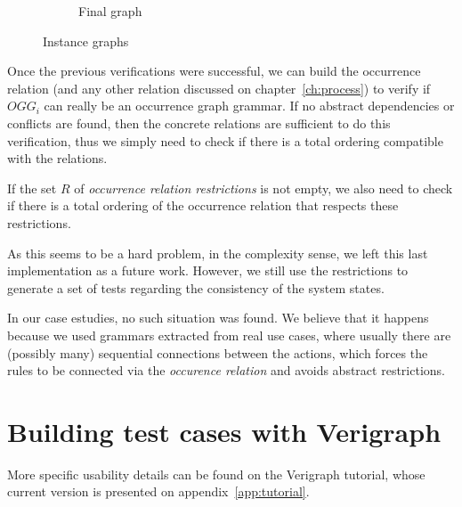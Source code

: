 \begin{example}
\begin{figure}[!ht]
\begin{subfigure}[t]{.5\textwidth}
    \caption{Final graph}
  \end{subfigure}
  \caption{Instance graphs}\label{fig:tests:graphs}
\end{figure}
\end{example}

Once the previous verifications were successful, we can build the occurrence relation (and any other relation discussed on chapter~\ref{ch:process}) to verify if $OGG_i$ can really be an occurrence graph grammar. If no abstract dependencies or conflicts are found, then the concrete relations are sufficient to do this verification, thus we simply need to check if there is a total ordering compatible with the relations.

\begin{example}
\end{example}

If the set $R$ of \emph{occurrence relation restrictions} is not empty, we also need to check if there is a total ordering of the occurrence relation that respects these restrictions.

As this seems to be a hard problem, in the complexity sense, we left this last implementation as a future work. However, we still use the restrictions to generate a set of tests regarding the consistency of the system states.

In our case estudies, no such situation was found. We believe that it happens because we used grammars extracted from real use cases, where usually there are (possibly many) sequential connections between the actions, which forces the rules to be connected via the \emph{occurence relation} and avoids abstract restrictions.

\section{Building test cases with Verigraph}

More specific usability details can be found on the Verigraph tutorial, whose current version is presented on appendix~\ref{app:tutorial}.

